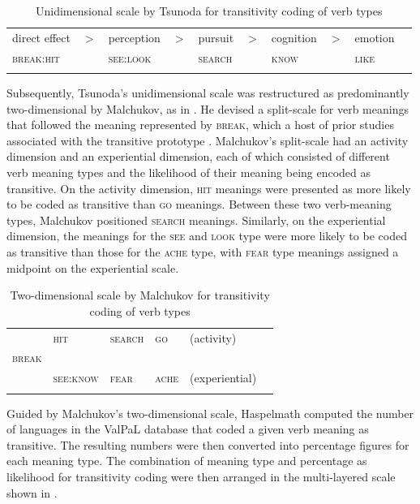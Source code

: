 \documentclass[output=paper,colorlinks,citecolor=brown
]{langscibook}
\begin{document}
\begin{table}
\caption{Unidimensional scale by Tsunoda for transitivity coding of verb types}
\label{tab:schaefer:sheg7}
 \begin{tabularx}{\textwidth}{llllllllll}
  \lsptoprule
{direct effect} & $>$ & perception & $>$ & pursuit & $>$ & cognition & $>$ & emotion \\
{\textsc{break:hit}} && {\textsc{see:look}} && \textsc{search} && \textsc{know} && \textsc{like} \\ 
  \lspbottomrule
 \end{tabularx}
\end{table}

Subsequently, Tsunoda’s unidimensional scale was restructured as predominantly two-dimensional by Malchukov, as in . He devised a split-scale for verb meanings that followed the meaning represented by \textsc{break}, which a host of prior studies associated with the transitive prototype \citep{Rice1987, Croft1993, Kittila2008}. Malchukov’s split-scale had an activity dimension and an experiential dimension, each of which consisted of different verb meaning types and the likelihood of their meaning being encoded as transitive. On the activity dimension, \textsc{hit} meanings were presented as more likely to be coded as transitive than \textsc{go} meanings. Between these two verb-meaning types, Malchukov positioned \textsc{search} meanings. Similarly, on the experiential dimension, the meanings for the \textsc{see} and \textsc{look} type were more likely to be coded as transitive than those for the \textsc{ache} type, with \textsc{fear} type meanings assigned a midpoint on the experiential scale. 

\begin{table}
\caption{Two-dimensional scale by Malchukov for transitivity coding of verb types}
\label{tab:schaefer:sheg8}
 \begin{tabularx}{.75\textwidth}{llllll}
  \lsptoprule
            & \textsc{hit} & \textsc{search}  & \textsc{go} & {(activity)}\\
  \textsc{break}  &      &       &           &  \\
     &   {\textsc{see:know}} &   \textsc{fear}  &    \textsc{ache}     & {(experiential)} \\
  \lspbottomrule
 \end{tabularx}
\end{table}

 Guided by Malchukov’s two-dimensional scale, Haspelmath computed the number of languages in the ValPaL database that coded a given verb meaning as transitive. The resulting numbers were then converted into percentage figures for each meaning type. The combination of meaning type and percentage as likelihood for transitivity coding were then arranged in the multi-layered scale shown in .  
 
\end{document}
